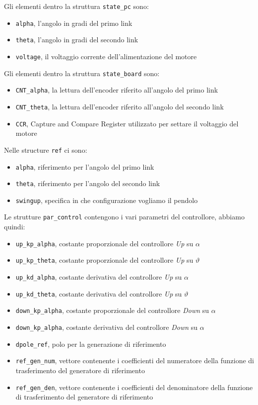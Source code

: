 Gli elementi dentro la struttura \texttt{state\_pc} sono:
\begin{itemize}
	\item \texttt{alpha}, l'angolo in gradi del primo link
	\item \texttt{theta}, l'angolo in gradi del secondo link
	\item \texttt{voltage}, il voltaggio corrente dell'alimentazione del motore
\end{itemize}
Gli elementi dentro la struttura \texttt{state\_board} sono:
\begin{itemize}
	\item \texttt{CNT\_alpha}, la lettura dell'encoder riferito all'angolo del primo link
	\item \texttt{CNT\_theta}, la lettura dell'encoder riferito all'angolo del secondo link
	\item \texttt{CCR}, Capture and Compare Register utilizzato per settare il voltaggio del motore
\end{itemize}
Nelle structure \texttt{ref} ci sono:
\begin{itemize}
	\item \texttt{alpha}, riferimento per l'angolo del primo link
	\item \texttt{theta}, riferimento per l'angolo del secondo link
	\item \texttt{swingup}, specifica in che configurazione vogliamo il pendolo
\end{itemize}
Le strutture \texttt{par\_control} contengono i vari parametri del controllore, abbiamo quindi:
\begin{itemize}
	\item \texttt{up\_kp\_alpha}, costante proporzionale del controllore \textit{Up} su $\alpha$
	\item \texttt{up\_kp\_theta}, costante proporzionale del controllore \textit{Up} su $\vartheta$
	\item \texttt{up\_kd\_alpha}, costante derivativa del controllore \textit{Up} su $\alpha$
	\item \texttt{up\_kd\_theta}, costante derivativa del controllore \textit{Up} su $\vartheta$
	\item \texttt{down\_kp\_alpha}, costante proporzionale del controllore \textit{Down} su $\alpha$
	\item \texttt{down\_kp\_alpha}, costante derivativa del controllore \textit{Down} su $\alpha$
	\item \texttt{dpole\_ref}, polo per la generazione di riferimento
	\item \texttt{ref\_gen\_num}, vettore contenente i coefficienti del numeratore della funzione di trasferimento del generatore di riferimento
	\item \texttt{ref\_gen\_den}, vettore contenente i coefficienti del denominatore della funzione di trasferimento del generatore di riferimento
\end{itemize}
